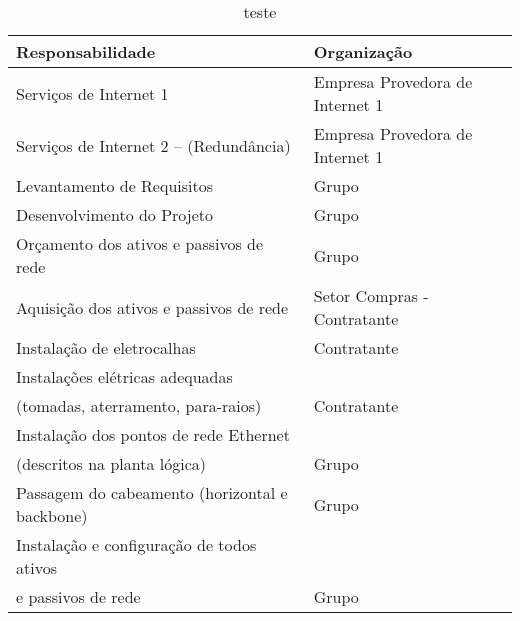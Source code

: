 \begin{table}[h!]
\centering
\caption{teste}
\label{tab3}
\begin{tabular}{|l|l|}
\hline
\textbf{Responsabilidade} & \textbf{Organização} \\ \hline
Serviços de Internet 1 & Empresa Provedora de Internet 1 \\ \hline
Serviços de Internet 2 – (Redundância) & Empresa Provedora de Internet 1 \\ \hline
Levantamento de Requisitos & Grupo \\ \hline
Desenvolvimento do Projeto & Grupo \\ \hline
Orçamento dos ativos e passivos de rede & Grupo \\ \hline
Aquisição dos ativos e passivos de rede & Setor Compras - Contratante \\ \hline
Instalação de eletrocalhas & Contratante \\ \hline
Instalações elétricas adequadas\\ 	(tomadas, aterramento, para-raios) & Contratante \\ \hline
Instalação dos pontos de rede Ethernet\\ (descritos na planta lógica) & Grupo \\ \hline
Passagem do cabeamento (horizontal e backbone) & Grupo \\ \hline
Instalação e configuração de todos ativos\\ e passivos de rede & Grupo \\ \hline
\end{tabular}
\end{table}

